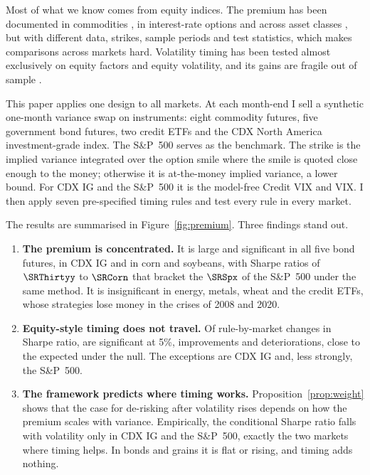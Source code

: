 \documentclass[11pt,a4paper]{article}
\theoremstyle{remark}
\begin{document}
Most of what we know comes from equity indices. The premium has been documented in commodities \citep{trolle2010,prokopczuk2017}, in interest-rate options \citep{trolleschwartz2014,choi2017} and across asset classes \citep{fallon2015,khalfallah2025}, but with different data, strikes, sample periods and test statistics, which makes comparisons across markets hard. Volatility timing has been tested almost exclusively on equity factors and equity volatility, and its gains are fragile out of sample \citep{cederburg2020}.

This paper applies one design to all markets. At each month-end I sell a synthetic one-month variance swap on \NInstr{} instruments: eight commodity futures, five government bond futures, two credit ETFs and the CDX North America investment-grade index. The S\&P~500 serves as the benchmark. The strike is the implied variance integrated over the option smile where the smile is quoted close enough to the money; otherwise it is at-the-money implied variance, a lower bound. For CDX IG and the S\&P~500 it is the model-free Credit VIX and VIX. I then apply seven pre-specified timing rules and test every rule in every market.

The results are summarised in Figure~\ref{fig:premium}. Three findings stand out.

\begin{enumerate}
\item \textbf{The premium is concentrated.} It is large and significant in all five bond futures, in CDX IG and in corn and soybeans, with Sharpe ratios of $\SRThirtyy$ to $\SRCorn$ that bracket the $\SRSpx$ of the S\&P~500 under the same method. It is insignificant in energy, metals, wheat and the credit ETFs, whose strategies lose money in the crises of 2008 and 2020.
\item \textbf{Equity-style timing does not travel.} Of \NTests{} rule-by-market changes in Sharpe ratio, \NSig{} are significant at 5\%, \NSigUp{} improvements and \NSigDown{} deteriorations, close to the \NExpected{} expected under the null. The exceptions are CDX IG and, less strongly, the S\&P~500.
\item \textbf{The framework predicts where timing works.} Proposition~\ref{prop:weight} shows that the case for de-risking after volatility rises depends on how the premium scales with variance. Empirically, the conditional Sharpe ratio falls with volatility only in CDX IG and the S\&P~500, exactly the two markets where timing helps. In bonds and grains it is flat or rising, and timing adds nothing.
\end{enumerate}
\end{document}
